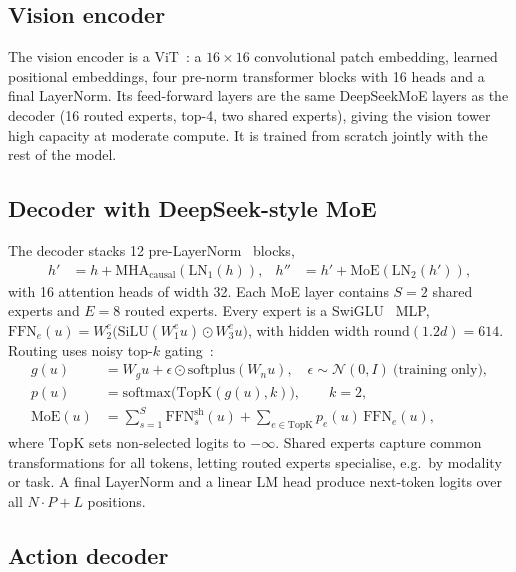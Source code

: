 \documentclass[11pt]{article}
\begin{document}
\subsection{Vision encoder}

The vision encoder is a ViT~\cite{dosovitskiy2021vit}: a $16{\times}16$ convolutional patch
embedding, learned positional embeddings, four pre-norm transformer blocks with 16 heads and
a final LayerNorm. Its feed-forward layers are the same DeepSeekMoE layers as the decoder
(16 routed experts, top-4, two shared experts), giving the vision tower high capacity at
moderate compute. It is trained from scratch jointly with the rest of the model.

\subsection{Decoder with DeepSeek-style MoE}
\label{sec:moe}

The decoder stacks 12 pre-LayerNorm~\cite{xiong2020layer} blocks,
\begin{align}
  h' &= h + \mathrm{MHA}_{\text{causal}}(\mathrm{LN}_1(h)), &
  h'' &= h' + \mathrm{MoE}(\mathrm{LN}_2(h')),
\end{align}
with 16 attention heads of width 32. Each MoE layer contains $S=2$ shared experts and $E=8$
routed experts. Every expert is a SwiGLU~\cite{shazeer2020glu} MLP,
$\mathrm{FFN}_e(u)=W_2^{e}\big(\mathrm{SiLU}(W_1^{e}u)\odot W_3^{e}u\big)$, with hidden width
$\mathrm{round}(1.2d)=614$. Routing uses noisy top-$k$ gating~\cite{shazeer2017outrageously}:
\begin{align}
  g(u) &= W_g u + \epsilon\odot\mathrm{softplus}(W_n u),\quad \epsilon\sim\mathcal N(0,I)\ \text{(training only)},\\
  p(u) &= \mathrm{softmax}\big(\mathrm{TopK}(g(u),k)\big),\qquad k=2,\\
  \mathrm{MoE}(u) &= \sum_{s=1}^{S}\mathrm{FFN}^{\text{sh}}_{s}(u) + \sum_{e\in\mathrm{TopK}} p_e(u)\,\mathrm{FFN}_e(u),
\end{align}
where $\mathrm{TopK}$ sets non-selected logits to $-\infty$. Shared experts capture common
transformations for all tokens, letting routed experts specialise, e.g.\ by modality or
task. A final LayerNorm and a linear LM head produce next-token logits over all
$N\cdot P+L$ positions.

\subsection{Action decoder}
\end{document}
